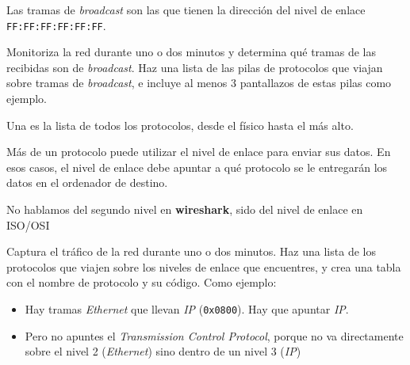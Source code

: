 \begin{homeworkProblem}

  Las tramas de \textit{broadcast} son las que tienen la dirección del nivel de enlace \texttt{FF:FF:FF:FF:FF:FF}.

  Monitoriza la red durante uno o dos minutos y determina qué tramas de las recibidas son de \textit{broadcast}. Haz una lista de las pilas de protocolos que viajan sobre tramas de \textit{broadcast}, e incluye al menos 3 pantallazos de estas pilas como ejemplo.

  
  \begin{adjustwidth}{2cm}{}
    \small{Una  es la lista de todos los protocolos, desde el físico hasta el más alto.}
  \end{adjustwidth}

\end{homeworkProblem}


\begin{homeworkProblem}
  Más de un protocolo puede utilizar el nivel de enlace para enviar sus datos. En esos casos, el nivel de enlace debe apuntar a qué protocolo se le entregarán los datos en el ordenador de destino.
  \begin{adjustwidth}{2cm}{}
  \small{No hablamos del segundo nivel en \textbf{wireshark}, sido del nivel de enlace en ISO/OSI}
  \end{adjustwidth}
  
  Captura el tráfico de la red durante uno o dos minutos. Haz una lista de los protocolos que viajen sobre los niveles de enlace que encuentres, y crea una tabla con el nombre de protocolo y su código. Como ejemplo:
  \begin{itemize}
  \item Hay tramas \textit{Ethernet} que llevan \textit{IP} (\texttt{0x0800}). Hay que apuntar \textit{IP}.
  \item Pero no apuntes el \textit{Transmission Control  Protocol}, porque no va directamente sobre el nivel 2 (\textit{Ethernet}) sino dentro de un nivel 3 (\textit{IP})
  \end{itemize}
\end{homeworkProblem}


